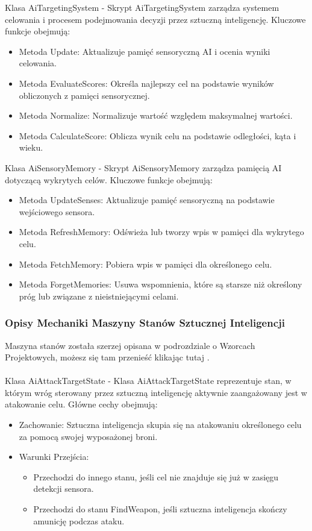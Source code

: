 Klasa AiTargetingSystem -
Skrypt AiTargetingSystem zarządza systemem celowania i procesem podejmowania decyzji przez sztuczną inteligencję. Kluczowe funkcje obejmują:
\begin{itemize}
  \item Metoda Update: Aktualizuje pamięć sensoryczną AI i ocenia wyniki celowania.
  \item Metoda EvaluateScores: Określa najlepszy cel na podstawie wyników obliczonych z pamięci sensorycznej.
  \item Metoda Normalize: Normalizuje wartość względem maksymalnej wartości.
  \item Metoda CalculateScore: Oblicza wynik celu na podstawie odległości, kąta i wieku.
\end{itemize}

Klasa AiSensoryMemory -
Skrypt AiSensoryMemory zarządza pamięcią AI dotyczącą wykrytych celów. Kluczowe funkcje obejmują:
\begin{itemize}
  \item Metoda UpdateSenses: Aktualizuje pamięć sensoryczną na podstawie wejściowego sensora.
  \item Metoda RefreshMemory: Odświeża lub tworzy wpis w pamięci dla wykrytego celu.
  \item Metoda FetchMemory: Pobiera wpis w pamięci dla określonego celu.
  \item Metoda ForgetMemories: Usuwa wspomnienia, które są starsze niż określony próg lub związane z nieistniejącymi celami.
\end{itemize}

\subsubsection{Opisy Mechaniki Maszyny Stanów Sztucznej Inteligencji}
Maszyna stanów została szerzej opisana w podrozdziale o Wzorcach Projektowych, możesz się tam przenieść klikając tutaj . \\\\
Klasa AiAttackTargetState -
Klasa AiAttackTargetState reprezentuje stan, w którym wróg sterowany przez sztuczną inteligencję aktywnie zaangażowany jest w atakowanie celu. Główne cechy obejmują:
\begin{itemize}
  \item Zachowanie: Sztuczna inteligencja skupia się na atakowaniu określonego celu za pomocą swojej wyposażonej broni.
  \item Warunki Przejścia:
    \begin{itemize}
      \item Przechodzi do innego stanu, jeśli cel nie znajduje się już w zasięgu detekcji sensora.
      \item Przechodzi do stanu FindWeapon, jeśli sztuczna inteligencja skończy amunicję podczas ataku.
    \end{itemize}
\end{itemize}

